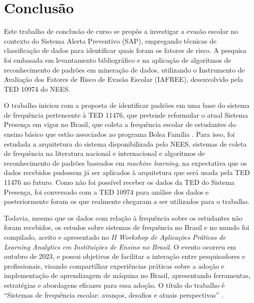 \chapter{Conclusão}



Este trabalho de conclusão de curso se propôs a investigar a evasão escolar no contexto do Sistema Alerta Preventivo (SAP), empregando técnicas de classificação de dados para identificar quais foram os fatores de risco. A pesquisa foi embasada em levantamento bibliográfico e na aplicação de algoritmos de reconhecimento de padrões em mineração de dados, utilizando o Instrumento de Avaliação dos Fatores de Risco de Evasão Escolar (IAFREE), desenvolvido pela TED 10974 do NEES.

O trabalho iniciou com a proposta de identificar padrões em uma base do sistema de frequência pertencente à TED 11476, que pretende reformular o atual Sistema Presença em vigor no Brasil, que coleta a frequência escolar de estudantes do ensino básico que estão associados ao programa Bolsa Familia \cite{BolsaFamilia}. Para isso, foi estudada a arquitetura do sistema disponibilizada pelo NEES, sistemas de coleta de frequência na literatura nacional e internacional e algoritmos de reconhecimento de padrões baseados em \textit{machine learning}, na expectativa que os dados recebidos pudessem já ser aplicados à arquitetura que será usada pela TED 11476 no futuro. Como não foi possível receber os dados da TED do Sistema Presença, foi conversado com a TED 10974 para análise dos dados e posteriormente foram os que realmente chegaram a ser utilizados para o trabalho.

Todavia, mesmo que os dados com relação à frequência sobre os estudantes não foram recebidos, os estudos sobre sistemas de frequência no Brasil e no mundo foi compilado, aceito e apresentado no \textit{II Workshop de Aplicações Práticas de Learning Analytics em Instituições de Ensino no Brasil}. O evento ocorreu em outubro de 2023, e possui objetivos de facilitar a interação entre pesquisadores e profissionais, visando compartilhar experiências práticas sobre a adoção e implementação de aprendizagem de máquina no Brasil, apresentando ferramentas, estratégias e abordagens eficazes para essa adoção. O título do trabalho é ``Sistemas de frequência escolar: avanços, desafios e atuais perspectivas'' \cite{wapladan}.


